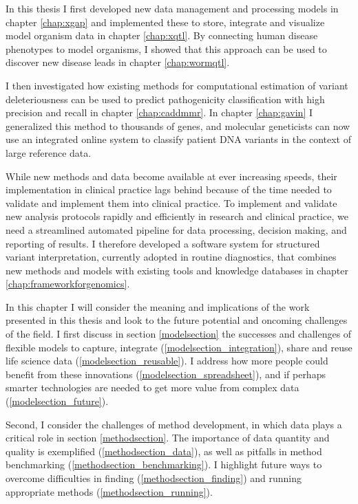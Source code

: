 In this thesis I first developed new data management and processing models in chapter \ref{chap:xgap} and implemented these to store, integrate and visualize model organism data in chapter \ref{chap:xqtl}.
By connecting human disease phenotypes to model organisms, I showed that this approach can be used to discover new disease leads in chapter \ref{chap:wormqtl}.

I then investigated how existing methods for computational estimation of variant deleteriousness can be used to predict pathogenicity classification with high precision and recall in chapter \ref{chap:caddmmr}.
In chapter \ref{chap:gavin} I generalized this method to thousands of genes, and molecular geneticists can now use an integrated online system to classify patient DNA variants in the context of large reference data.

While new methods and data become available at ever increasing speeds, their implementation in clinical practice lags behind because of the time needed to validate and implement them into clinical practice.
To implement and validate new analysis protocols rapidly and efficiently in research and clinical practice, we need a streamlined automated pipeline for data processing, decision making, and reporting of results.
I therefore developed a software system for structured variant interpretation, currently adopted in routine diagnostics, that combines new methods and models with existing tools and knowledge databases in chapter \ref{chap:frameworkforgenomics}.

In this chapter I will consider the meaning and implications of the work presented in this thesis and look to the future potential and oncoming challenges of the field.
I first discuss in section \ref{modelsection} the successes and challenges of flexible models to capture, integrate (\ref{modelsection_integration}), share and reuse life science data (\ref{modelsection_reusable}).
I address how more people could benefit from these innovations (\ref{modelsection_spreadsheet}), and if perhaps smarter technologies are needed to get more value from complex data (\ref{modelsection_future}).

Second, I consider the challenges of method development, in which data plays a critical role in section \ref{methodsection}.
The importance of data quantity and quality is exemplified (\ref{methodsection_data}), as well as pitfalls in method benchmarking (\ref{methodsection_benchmarking}).
I highlight future ways to overcome difficulties in finding (\ref{methodsection_finding}) and running appropriate methods (\ref{methodsection_running}).

